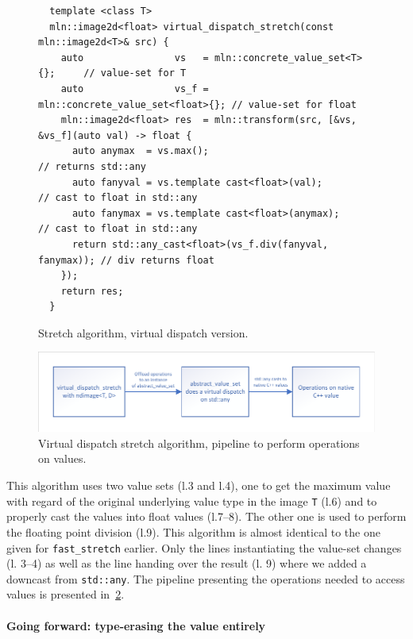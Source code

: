 \begin{figure}[htbp]
  \begin{verbatim}
  template <class T>
  mln::image2d<float> virtual_dispatch_stretch(const mln::image2d<T>& src) {
    auto                vs   = mln::concrete_value_set<T>{};     // value-set for T
    auto                vs_f = mln::concrete_value_set<float>{}; // value-set for float
    mln::image2d<float> res  = mln::transform(src, [&vs, &vs_f](auto val) -> float {
      auto anymax  = vs.max();                                 // returns std::any
      auto fanyval = vs.template cast<float>(val);             // cast to float in std::any
      auto fanymax = vs.template cast<float>(anymax);          // cast to float in std::any
      return std::any_cast<float>(vs_f.div(fanyval, fanymax)); // div returns float
    });
    return res;
  }
\end{verbatim}
  \caption{Stretch algorithm, virtual dispatch version.}
  \label{fig:stretch.virtual.dispatch.code}
\end{figure}

\begin{figure}[htbp]
  \centering
  \includegraphics[width=.8\linewidth]{../figures/static_dynamic_bridge/virtual_dispatch_stretch}
  \caption{Virtual dispatch stretch algorithm, pipeline to perform operations on values.}
  \label{fig:static_dyn.virtual_dispatch_stretch}
\end{figure}

This algorithm uses two value sets (l.3 and l.4), one to get the maximum value with regard of the original underlying
value type in the image \texttt{T} (l.6) and to properly cast the values into float values (l.7--8). The other one is
used to perform the floating point division (l.9). This algorithm is almost identical to the one given for
\texttt{fast\_stretch} earlier. Only the lines instantiating the value-set changes (l. 3--4) as well as the line handing
over the result (l. 9) where we added a downcast from \texttt{std::any}. The pipeline presenting the operations needed
to access values is presented in~\cref{fig:static_dyn.virtual_dispatch_stretch}.


\paragraph{Going forward: type-erasing the value entirely}

